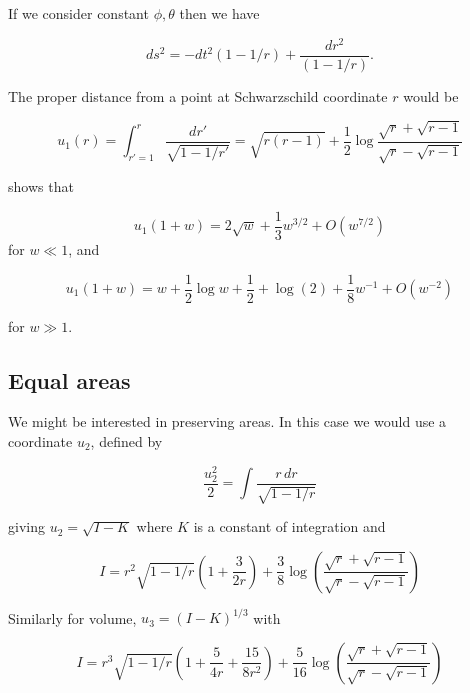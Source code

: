 \documentclass{article}
\begin{document}
If we consider constant $\phi,\theta$ then we have 

\label{sec:headings}

\begin{equation}
  ds^2=-dt^2\left(1-1/r\right)
  +\frac{dr^2}{\left(1-1/r\right)}.
\end{equation}

The proper distance from a point at Schwarzschild coordinate $r$ would be

\begin{equation}
  u_1(r)=
  \int_{r'=1}^r\frac{dr'}{\sqrt{1-1/r'}}=
  \sqrt{r(r-1)} + \frac{1}{2}\log\frac{\sqrt{r}+\sqrt{r-1}}{\sqrt{r}-\sqrt{r-1}}
  \end{equation}

\cite{hankin2021} shows that



\begin{equation}
  u_1(1+w)=2\sqrt{w} + \frac{1}{3}w^{3/2} + O(w^{7/2})
\end{equation}
for $w\ll 1$, and 

\begin{equation}
  u_1(1+w)=w + \frac{1}{2}\log w + \frac{1}{2} +
  \log(2) + \frac{1}{8}w^{-1} + O(w^{-2})
\end{equation}

for $w\gg 1$.

\subsection{Equal areas}

We might be interested in preserving areas.  In this case we would use
a coordinate $u_2$, defined by

\begin{equation}
  \frac{u_2^2}{2}=\int\frac{r\,dr}{\sqrt{1-1/r}}
\end{equation}

giving $u_2=\sqrt{I-K}$ where $K$ is a constant of integration and

\begin{equation}
    I = r^2\sqrt{1-{1}/{r}}\left(1+\frac{3}{2r}\right)
 + \frac{3}{8}\log\left(\frac{\sqrt{r}+\sqrt{r-1}}{\sqrt{r}-\sqrt{r-1}}\right)
\end{equation}

Similarly for volume, $u_3=(I-K)^{1/3}$ with 

\begin{equation}
    I = r^3\sqrt{1-{1}/{r}}\left(1+\frac{5}{4r} + \frac{15}{8r^2}\right)
+ \frac{5}{16}\log\left(\frac{\sqrt{r}+\sqrt{r-1}}{\sqrt{r}-\sqrt{r-1}}\right)
\end{equation}
\end{document}
